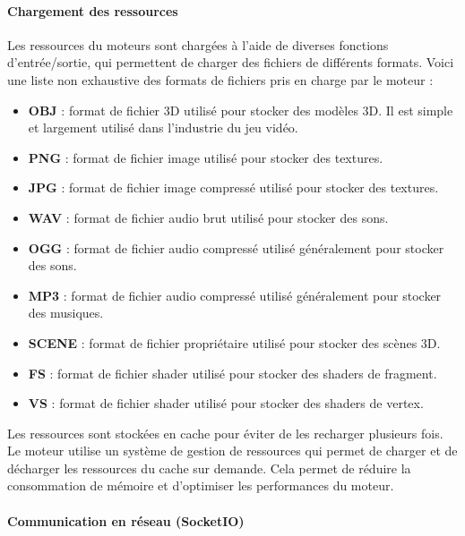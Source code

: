 \paragraph{Chargement des ressources}

    Les ressources du moteurs sont chargées à l'aide de diverses
    fonctions d'entrée/sortie, qui permettent de charger des fichiers
    de différents formats. Voici une liste non exhaustive des formats
    de fichiers pris en charge par le moteur :\\
    \begin{itemize}
        \item \textbf{OBJ} : format de fichier 3D utilisé pour stocker
        des modèles 3D. Il est simple et largement utilisé dans
        l'industrie du jeu vidéo. \cite{obj_format}
        \item \textbf{PNG} : format de fichier image utilisé pour stocker
        des textures.
        \item \textbf{JPG} : format de fichier image compressé utilisé pour stocker
        des textures.
        \item \textbf{WAV} : format de fichier audio brut utilisé pour stocker
        des sons.
        \item \textbf{OGG} : format de fichier audio compressé utilisé généralement pour
        stocker des sons.
        \item \textbf{MP3} : format de fichier audio compressé utilisé généralement pour
        stocker des musiques.
        \item \textbf{SCENE} : format de fichier propriétaire utilisé pour
        stocker des scènes 3D.
        \item \textbf{FS} : format de fichier shader utilisé pour stocker
        des shaders de fragment. \cite{glsl}
        \item \textbf{VS} : format de fichier shader utilisé pour stocker
        des shaders de vertex. \cite{glsl}\\
    \end{itemize}
    
    Les ressources sont stockées en cache pour éviter de les recharger
    plusieurs fois. Le moteur utilise un système de gestion de
    ressources qui permet de charger et de décharger les ressources
    du cache sur demande. Cela permet de réduire la consommation de mémoire et
    d'optimiser les performances du moteur.
\paragraph{Communication en réseau (SocketIO)}

